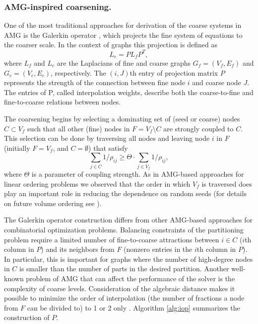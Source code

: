 \documentclass{llncs}
\begin{document}
\subsubsection{AMG-inspired coarsening.}
\par One of the most traditional approaches for derivation of the coarse systems in AMG is the Galerkin operator \cite{mgbooktrott}, which projects the fine system of equations to the coarser scale. In the context of graphs this projection is defined as
\begin{equation}
L_c = P L_f P^T,
\end{equation}
where $L_f$ and $L_c$ are the Laplacians of fine and coarse graphs $G_f=(V_f,E_f)$ and $G_c=(V_c,E_c)$, respectively. The $(i,J)$th entry of projection matrix $P$ represents the strength of the connection between fine node $i$ and coarse node $J$. The entries of P, called interpolation weights, describe both the coarse-to-fine and fine-to-coarse relations between nodes. 
\par The coarsening begins by selecting a dominating set of (seed or coarse) nodes $C \subset V_f$ such that all other (fine) nodes in $F=V_f\setminus C$ are strongly coupled to $C$. This selection can be done by traversing all nodes and leaving node $i$ in $F$ (initially $F=V_f$, and $C=\emptyset$) that satisfy
\begin{equation}
\sum_{j\in C} 1/\rho_{ij}  \geq \Theta \cdot \sum_{j\in V_f} 1/\rho_{ij},
\end{equation}
where $\Theta$ is a parameter of coupling strength. As in AMG-based approaches for linear ordering problems \cite{safro2005} we observed that the order in which $V_f$ is traversed does play an important role in reducing the dependence on random seeds (for details on future volume ordering see \cite{safro:relaxml}).
\par The Galerkin operator construction differs from other AMG-based approaches for combinatorial optimization problems. Balancing constraints of the partitioning problem require a limited number of fine-to-coarse attractions between $i\in C$ ($i$th column in $P$) and its neighbors from $F$ (nonzero entries in the $i$th column in $P$). In particular, this is important for graphs where the number of high-degree nodes in $C$ is smaller than the number of parts in the desired partition. Another well-known problem of AMG that can affect the performance of the solver is the complexity of coarse levels. Consideration of the algebraic distance makes it possible to minimize the order of interpolation (the number of fractions a node from $F$ can be divided to) to 1 or 2 only \cite{safro:relaxml}. Algorithm \ref{alg:iop} summarizes the construction of $P$.
\end{document}
